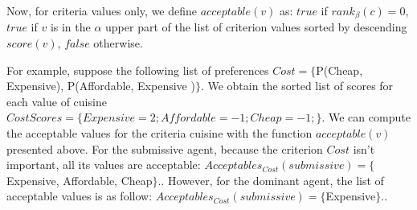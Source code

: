 \documentclass{article}
\begin{document}
Now, for criteria values only, we define $acceptable(v)$ as: $true$ if $rank_\beta(c)=0$, $true$ if $v$ is in the $\alpha$ upper part of the list of criterion values sorted by descending $score(v)$, $false$ otherwise.

\par For example, suppose the following list of preferences $ Cost = \{$P(Cheap, Expensive), P(Affordable, Expensive )$\}$.
We obtain the sorted list of scores for each value of cuisine   $Cost{Scores}= \{Expensive=2; Affordable= -1; Cheap= -1;\}$.
We can compute the acceptable values for the criteria cuisine with the function $acceptable(v)$ presented above. 
For the submissive agent, because the criterion $Cost$ isn't important, all its values are acceptable: $Acceptables_{Cost}(submissive) = \{$Expensive, Affordable, Cheap$\}.$. However, for the dominant agent, the list of acceptable values is as follow: $Acceptables_{Cost}(submissive) = \{$Expensive$\}.$.
\end{document}
